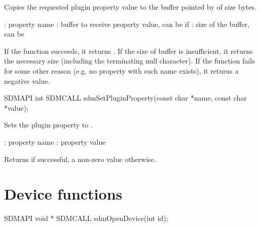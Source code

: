 \documentclass[a4paper,12pt,twoside,extrafontsizes]{memoir}
\begin{document}
\begin{funcdescr}
	Copies the requested plugin property value to the buffer pointed by  of size  bytes.
\end{funcdescr}

\begin{funcparams}
	: property name
	: buffer to receive property value, can be  if 
	: size of the buffer, can be 
\end{funcparams}

\begin{funcret}
	If the function succeeds, it returns . If the size of buffer is insufficient, it returns the necessary size (including the terminating null character). If the function fails for some other reason (e.g. no property with such name exists), it returns a negative value.
\end{funcret}



\begin{cfuncprototype}
SDMAPI int SDMCALL sdmSetPluginProperty(const char *name, const char *value);
\end{cfuncprototype}

\begin{funcdescr}
	Sets the plugin property  to .
\end{funcdescr}

\begin{funcparams}
	: property name
	: property value
\end{funcparams}

\begin{funcret}
	Returns  if successful, a non-zero value otherwise.
\end{funcret}

\section{Device functions}



\begin{cfuncprototype}
SDMAPI void * SDMCALL sdmOpenDevice(int id);
\end{cfuncprototype}
\end{document}
